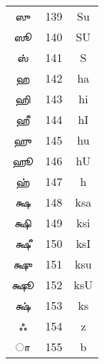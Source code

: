 \documentclass[a4paper,10pt]{article}
\begin{document}
\begin{table}[!t]
\begin{tabular}{ccc}
\t{ ஸு } & 139 & Su \\
\t{ ஸூ } & 140 & SU \\
\t{ ஸ் } & 141 & S \\
\t{ ஹ } & 142 & ha \\
\t{ ஹி } & 143 & hi \\
\t{ ஹீ } & 144 & hI \\
\t{ ஹு } & 145 & hu \\
\t{ ஹூ } & 146 & hU \\
\t{ ஹ் } & 147 & h \\
\t{ க்ஷ } & 148 & ksa \\
\t{ க்ஷி } & 149 & ksi \\



\t{ க்ஷீ } & 150 & ksI \\
\t{ க்ஷு } & 151 & ksu \\
\t{ க்ஷூ } & 152 & ksU \\
\t{ க்ஷ் } & 153 & ks \\
\t{ ஃ } & 154 & z \\
 \t{ ா } & 155 & b \\


\bottomrule
\end{tabular}
\end{table}
\end{document}

